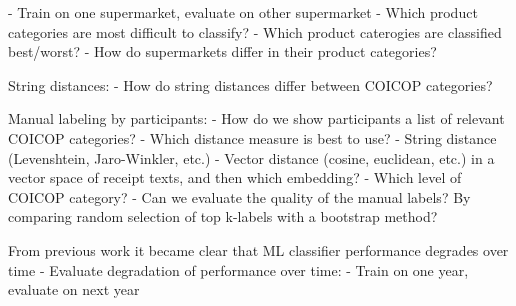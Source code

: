 \documentclass{article}
\begin{document}
- Train on one supermarket, evaluate on other supermarket
- Which product categories are most difficult to classify?
- Which product caterogies are classified best/worst?
- How do supermarkets differ in their product categories?

String distances:
- How do string distances differ between COICOP categories?

Manual labeling by participants:
- How do we show participants a list of relevant COICOP categories?
    - Which distance measure is best to use?
        - String distance (Levenshtein, Jaro-Winkler, etc.)
        - Vector distance (cosine, euclidean, etc.) in a vector space of receipt texts, and then which embedding?
- Which level of COICOP category?
- Can we evaluate the quality of the manual labels? By comparing random selection of top k-labels with a 
bootstrap method?

From previous work it became clear that ML classifier performance degrades over time
- Evaluate degradation of performance over time:
    - Train on one year, evaluate on next year
\end{document}
